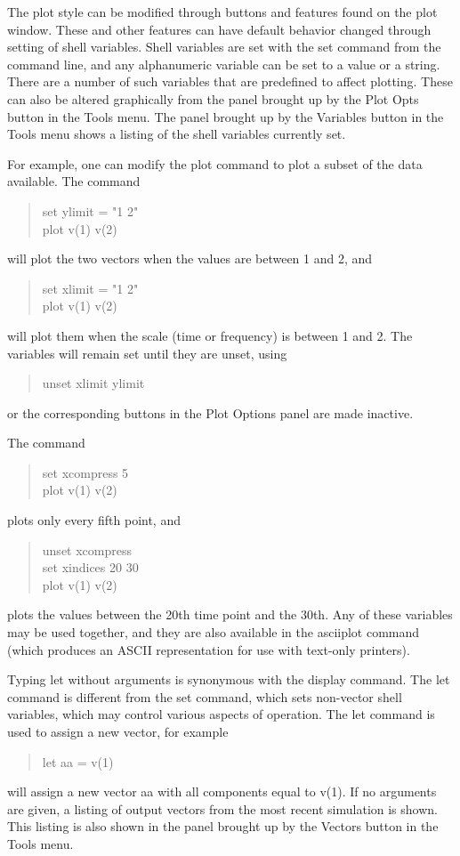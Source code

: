 The plot style can be modified through buttons and features found on
the plot window.  These and other features can have default behavior
changed through setting of shell variables.  Shell variables are set
with the {\cb set} command from the command line, and any alphanumeric
variable can be set to a value or a string.  There are a number of
such variables that are predefined to affect plotting.  These can also
be altered graphically from the panel brought up by the {\cb Plot
Opts} button in the {\cb Tools} menu.  The panel brought up by the
{\cb Variables} button in the {\cb Tools} menu shows a listing of the
shell variables currently set.

For example, one can modify the {\cb plot} command to plot a subset of the
data available.  The command
\begin{quote}\vt
set ylimit = "1 2"\\
plot v(1) v(2)
\end{quote}
will plot the two vectors when the values are between 1 and 2, and
\begin{quote}\vt
set xlimit = "1 2"\\
plot v(1) v(2)
\end{quote}
will plot them when the scale (time or frequency) is between 1 and 2.
The variables will remain set until they are unset, using
\begin{quote}\vt
unset xlimit ylimit
\end{quote}
or the corresponding buttons in the {\cb Plot Options} panel are made
inactive.

The command
\begin{quote}\vt
set xcompress 5\\
plot v(1) v(2)
\end{quote}
plots only every fifth point, and
\begin{quote}\vt
unset xcompress\\
set xindices 20 30\\
plot v(1) v(2)
\end{quote}
plots the values between the 20th time point and the 30th.  Any of
these variables may be used together, and they are also available in
the {\cb asciiplot} command (which produces an ASCII representation for
use with text-only printers).

Typing {\cb let} without arguments is synonymous with the {\cb display}
command.  The {\cb let} command is different from the {\cb set}
command, which sets non-vector shell variables, which may control various
aspects of {\WRspice} operation.  The {\cb let} command is used to assign
a new vector, for example
\begin{quote}\vt
let aa = v(1)
\end{quote}
will assign a new vector {\vt aa} with all components equal to {\vt v(1)}.
If no arguments are given, a listing of output vectors from the most recent
simulation is shown.  This listing is also shown in the panel brought up
by the {\cb Vectors} button in the {\cb Tools} menu.

